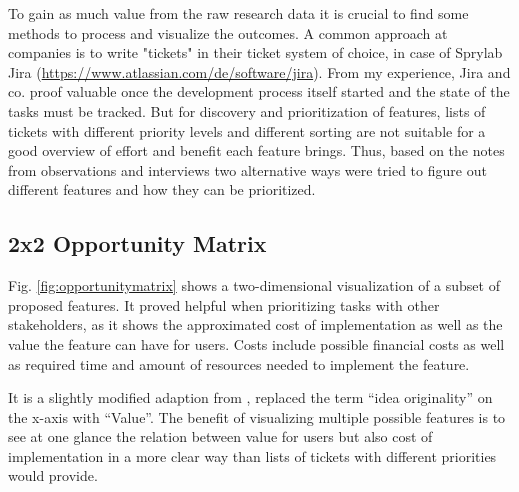 To gain as much value from the raw research data it is crucial to find some methods to process and visualize the outcomes.
A common approach at companies is to write "tickets" in their ticket system of choice, in case of Sprylab Jira (\url{https://www.atlassian.com/de/software/jira}).
From my experience, Jira and co. proof valuable once the development process itself started and the state of the tasks must be tracked.
But for discovery and prioritization of features, lists of tickets with different priority levels and different sorting are not suitable for a good overview of effort and benefit each feature brings.
Thus, based on the notes from observations and interviews two alternative ways were tried to figure out different features and how they can be prioritized.

\subsection{2x2 Opportunity Matrix}

Fig. \ref{fig:opportunitymatrix} shows a two-dimensional visualization of a subset of proposed features.
It proved helpful when prioritizing tasks with other stakeholders,
as it shows the approximated cost of implementation as well as the value the feature can have for users.
Costs include possible financial costs as well as required time and amount of resources needed to implement the feature.

It is a slightly modified adaption from \cite[p. 181]{LearnHCI:2020ys}, replaced the term ``idea originality'' on the x-axis with ``Value''.
The benefit of visualizing multiple possible features is to see at one glance the relation between value for users but also cost of implementation in a more clear way than lists of tickets with different priorities would provide.

